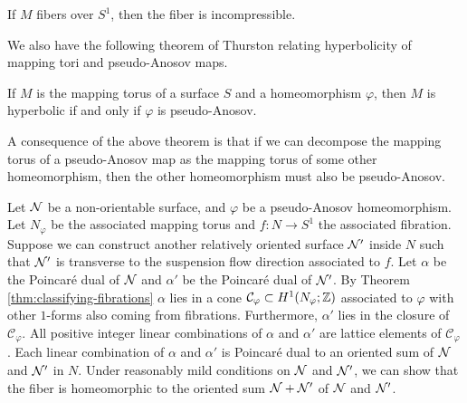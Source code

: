 \begin{fact}
  If $M$ fibers over $S^1$, then the fiber is incompressible.
\end{fact}

We also have the following theorem of Thurston relating hyperbolicity of mapping tori and pseudo-Anosov maps.
\begin{thm}
  If $M$ is the mapping torus of a surface $S$ and a homeomorphism $\varphi$, then $M$ is hyperbolic if and only if $\varphi$ is pseudo-Anosov.
\end{thm}

A consequence of the above theorem is that if we can decompose the mapping torus of a pseudo-Anosov map as the mapping torus of some other homeomorphism, then the other homeomorphism must also be pseudo-Anosov.

Let $\mathcal{N}$ be a non-orientable surface, and $\varphi$ be a pseudo-Anosov homeomorphism.
Let $N_\varphi$ be the associated mapping torus and $f:N\rightarrow S^1$ the associated fibration.
Suppose we can construct another relatively oriented surface $\mathcal{N}'$ inside $N$ such that $\mathcal{N}'$ is transverse to the suspension flow direction associated to $f$.
Let $\alpha$ be the Poincar\'e dual of $\mathcal{N}$ and $\alpha'$ be the Poincar\'e dual of $\mathcal{N}'$.
By Theorem \ref{thm:classifying-fibrations} $\alpha$ lies in a cone $\mathcal{C}_\varphi \subset H^1(N_\varphi; \mathbb{Z})$ associated to $\varphi$ with other $1$-forms also coming from fibrations.
Furthermore, $\alpha'$ lies in the closure of $\mathcal{C}_\varphi$.
All positive integer linear combinations of $\alpha$ and $\alpha'$ are lattice elements of $\mathcal{C}_\varphi$.
Each linear combination of $\alpha$ and $\alpha'$ is Poincar\'e dual to an oriented sum of $\mathcal{N}$ and $\mathcal{N}'$ in $N$.
Under reasonably mild conditions on $\mathcal{N}$ and $\mathcal{N}'$, we can show that the fiber is homeomorphic to the oriented sum $\mathcal{N} + \mathcal{N}'$ of $\mathcal{N}$ and $\mathcal{N}'$.

